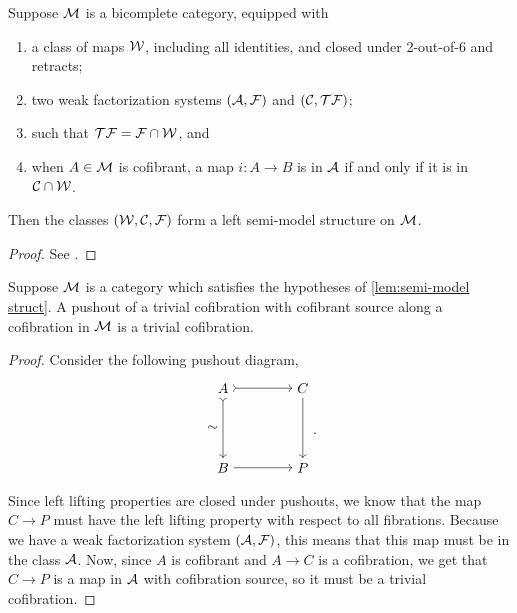 \documentclass{amsart}
\begin{document}
\begin{lem}\label{lem:semi-model struct}
    Suppose $\mathcal{M}$ is a bicomplete category, equipped with
    \begin{enumerate}
        \item a class of maps $\mathcal{W}$, including all identities, and closed under 2-out-of-6 and retracts;
        \item two weak factorization systems $(\mathcal{A},\mathcal{F})$ and $(\mathcal{C},\mathcal{T}\mathcal{F})$;
        \item such that $\mathcal{T}\mathcal{F}=\mathcal{F}\cap\mathcal{W}$, and 
        \item when $A\in\mathcal{M}$ is cofibrant, a map $i:A\to B$ is in $\mathcal{A}$ if and only if it is in $\mathcal{C}\cap\mathcal{W}$.
    \end{enumerate}
    Then the classes $(\mathcal{W},\mathcal{C},\mathcal{F})$ form a left semi-model structure on $\mathcal{M}$.
\end{lem}
\begin{proof}
    See \cite[Lem. 6.7]{KL}.
\end{proof}

\begin{lem}
    Suppose $\mathcal{M}$ is a category which satisfies the hypotheses of \ref{lem:semi-model struct}. A pushout of a trivial cofibration with cofibrant source along a cofibration in $\mathcal{M}$ is a trivial cofibration.
\end{lem}
\begin{proof}
    Consider the following pushout diagram,
    \[\begin{matrix}\begin{tikzpicture}
        \node (A) at (0,0) {$A$};
        \node (X) at (2,0) {$C$};
        \node (B) at (0,-2) {$B$};
        \node (Y) at (2,-2) {$P$};
        \draw[>->] (A) to node[left]{$\sim$} (B);
        \draw[>->] (A) to (X);
        \draw[->] (X) to (Y);
        \draw[->] (B) to (Y);
    \end{tikzpicture}\end{matrix}.\]
    Since left lifting properties are closed under pushouts, we know that the map $C\to P$ must have the left lifting property with respect to all fibrations. Because we have a weak factorization system $(\mathcal{A},\mathcal{F})$, this means that this map must be in the class $\mathcal{A}$. Now, since $A$ is cofibrant and $A\to C$ is a cofibration, we get that $C\to P$ is a map in $\mathcal{A}$ with cofibration source, so it must be a trivial cofibration.
\end{proof}
\end{document}
